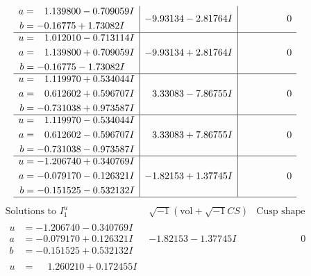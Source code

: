 \documentclass[1p]{elsarticle_modified}
\theoremstyle{definition}
\newcommand{\I}{\sqrt{-1}}
\begin{document}
$$\begin{array}{c|c|c}
\begin{aligned}
a &= \phantom{-}1.139800 - 0.709059 I \\
b &= -0.16775 + 1.73082 I\end{aligned}
 & -9.93134 - 2.81764 I & \phantom{-0.000000 } 0 \\ \hline\begin{aligned}
u &= \phantom{-}1.012010 - 0.713114 I \\
a &= \phantom{-}1.139800 + 0.709059 I \\
b &= -0.16775 - 1.73082 I\end{aligned}
 & -9.93134 + 2.81764 I & \phantom{-0.000000 } 0 \\ \hline\begin{aligned}
u &= \phantom{-}1.119970 + 0.534044 I \\
a &= \phantom{-}0.612602 + 0.596707 I \\
b &= -0.731038 + 0.973587 I\end{aligned}
 & \phantom{-}3.33083 - 7.86755 I & \phantom{-0.000000 } 0 \\ \hline\begin{aligned}
u &= \phantom{-}1.119970 - 0.534044 I \\
a &= \phantom{-}0.612602 - 0.596707 I \\
b &= -0.731038 - 0.973587 I\end{aligned}
 & \phantom{-}3.33083 + 7.86755 I & \phantom{-0.000000 } 0 \\ \hline\begin{aligned}
u &= -1.206740 + 0.340769 I \\
a &= -0.079170 - 0.126321 I \\
b &= -0.151525 - 0.532132 I\end{aligned}
 & -1.82153 + 1.37745 I & \phantom{-0.000000 } 0\\
 \hline 
 \end{array}$$\newpage$$\begin{array}{c|c|c}  
\text{Solutions to }I^u_{1}& \I (\text{vol} + \sqrt{-1}CS) & \text{Cusp shape}\\
 \hline 
\begin{aligned}
u &= -1.206740 - 0.340769 I \\
a &= -0.079170 + 0.126321 I \\
b &= -0.151525 + 0.532132 I\end{aligned}
 & -1.82153 - 1.37745 I & \phantom{-0.000000 } 0 \\ \hline\begin{aligned}
u &= \phantom{-}1.260210 + 0.172455 I \\

\end{aligned}
\end{array}$$
\end{document}

